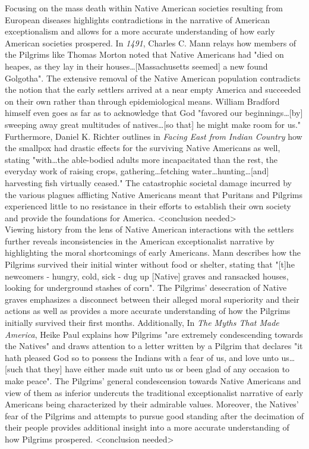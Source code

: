 \documentclass[letterpaper]{article}
\begin{document}
Focusing on the mass death within Native American societies resulting from European diseases highlights contradictions in the narrative of American exceptionalism and allows for a more accurate understanding of how early American societies prospered. In \emph{1491}, Charles C. Mann relays how members of the Pilgrims like Thomas Morton noted that Native Americans had "died on heapes, as they lay in their houses\ldots{}[Massachusetts seemed] a new found Golgotha". The extensive removal of the Native American population contradicts the notion that the early settlers arrived at a near empty America and succeeded on their own rather than through epidemiological means. William Bradford himself even goes as far as to acknowledge that God "favored our beginnings\ldots{}[by] sweeping away great multitudes of natives\ldots{}[so that] he might make room for us." Furthermore, Daniel K. Richter outlines in \emph{Facing East from Indian Country} how the smallpox had drastic effects for the surviving Native Americans as well, stating "with\ldots{}the able-bodied adults more incapacitated than the rest, the everyday work of raising crops, gathering\ldots{}fetching water\ldots{}hunting\ldots{}[and] harvesting fish virtually ceased." The catastrophic societal damage incurred by the various plagues afflicting Native Americans meant that Puritans and Pilgrims experienced little to no resistance in their efforts to establish their own society and provide the foundations for America. <conclusion needed>\\

Viewing history from the lens of Native American interactions with the settlers further reveals inconsistencies in the American exceptionalist narrative by highlighting the moral shortcomings of early Americans. Mann describes how the Pilgrims survived their initial winter without food or shelter, stating that "[t]he newcomers - hungry, cold, sick - dug up [Native] graves and ransacked houses, looking for underground stashes of corn". The Pilgrims' desecration of Native graves emphasizes a disconnect between their alleged moral superiority and their actions as well as provides a more accurate understanding of how the Pilgrims initially survived their first months. Additionally, In \emph{The Myths That Made America}, Heike Paul explains how Pilgrims "are extremely condescending towards the Natives" and draws attention to a letter written by a Pilgrim that declares "it hath pleased God so to possess the Indians with a fear of us, and love unto us\ldots{}[such that they] have either made suit unto us or been glad of any occasion to make peace". The Pilgrims' general condescension towards Native Americans and view of them as inferior undercuts the traditional exceptionalist narrative of early Americans being characterized by their admirable values. Moreover, the Natives' fear of the Pilgrims and attempts to pursue good standing after the decimation of their people provides additional insight into a more accurate understanding of how Pilgrims prospered. <conclusion needed>\\
\end{document}
